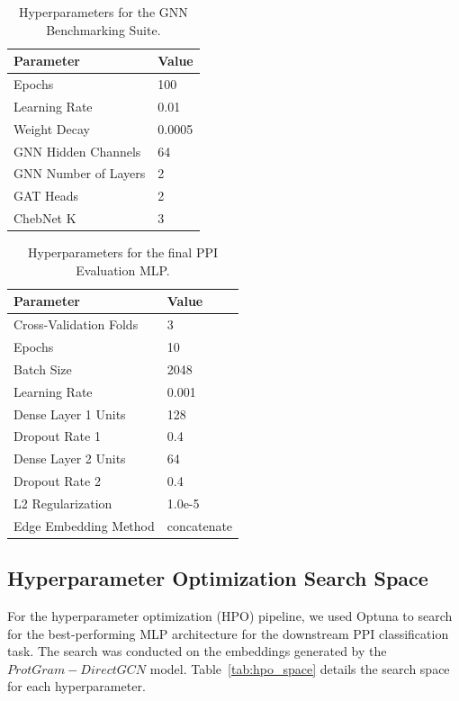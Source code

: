 \documentclass[utf8]{frontiers_suppmat}
\begin{document}
	\begin{table}[H]
		\centering
		\caption{Hyperparameters for the GNN Benchmarking Suite.}
		\label{tab:benchmark_params}
		\begin{tabular}{ll}
			\toprule
			\textbf{Parameter} & \textbf{Value} \\
			\midrule
			Epochs & 100 \\
			Learning Rate & 0.01 \\
			Weight Decay & 0.0005 \\
			GNN Hidden Channels & 64 \\
			GNN Number of Layers & 2 \\
			GAT Heads & 2 \\
			ChebNet K & 3 \\
			\bottomrule
		\end{tabular}
	\end{table}

	
	\begin{table}[H]
		\centering
		\caption{Hyperparameters for the final PPI Evaluation MLP.}
		\label{tab:ppi_mlp_params}
		\begin{tabular}{ll}
			\toprule
			\textbf{Parameter} & \textbf{Value} \\
			\midrule
			Cross-Validation Folds & 3 \\
			Epochs & 10 \\
			Batch Size & 2048 \\
			Learning Rate & 0.001 \\
			Dense Layer 1 Units & 128 \\
			Dropout Rate 1 & 0.4 \\
			Dense Layer 2 Units & 64 \\
			Dropout Rate 2 & 0.4 \\
			L2 Regularization & 1.0e-5 \\
			Edge Embedding Method & concatenate \\
			\bottomrule
		\end{tabular}
	\end{table}
	
	\subsection*{Hyperparameter Optimization Search Space}
	
	For the hyperparameter optimization (HPO) pipeline, we used Optuna to search for the best-performing MLP architecture for the downstream PPI classification task. The search was conducted on the embeddings generated by the \texttt{$ProtGram-DirectGCN$} model. Table~\ref{tab:hpo_space} details the search space for each hyperparameter.
	
\end{document}
